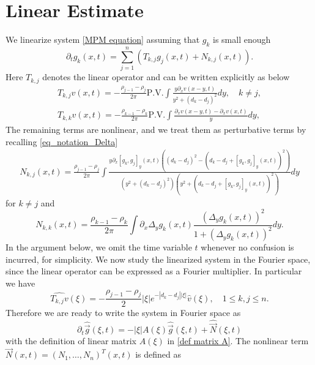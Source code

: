 \documentclass[11pt]{article}
\newcommand{\PV}{\mathrm{P.V.}}
\theoremstyle{definition}
\numberwithin{equation}{section}
\begin{document}
\section{Linear Estimate}\label{Sec Linear}
We linearize system \eqref{MPM equation} assuming that $g_k$ is small enough
\begin{equation}
   \partial_tg_k(x,t)=\sum_{j=1}^n\left(T_{k,j}g_j(x,t)+N_{k,j}(x,t)\right).
\end{equation}
Here $T_{k,j}$ denotes the linear operator and can be written explicitly as below
\begin{gather}\label{def linear operator}
    T_{k,j}v(x,t)=-\frac{\rho_{j-1}-\rho_j}{2\pi}\PV\int\frac{y\partial_xv(x-y,t)}{y^2+(d_k-d_j)^2}dy,\quad k\neq j,\\
    T_{k,k}v(x,t)=-\frac{\rho_{k-1}-\rho_k}{2\pi}\PV\int\frac{\partial_xv(x-y,t)-\partial_xv(x,t)}{y}dy,
\end{gather}
The remaining terms are nonlinear, and we treat them as perturbative terms by recalling \eqref{eq_notation_Delta}
\begin{gather}\label{def nonlinear k neq j}
    N_{k,j}(x,t)=\frac{\rho_{j-1}-\rho_j}{2\pi}\int\frac{y\partial_x[g_k,g_j]_y(x,t)\left((d_k-d_j)^2-(d_k-d_j+[g_k,g_j]_y(x,t))^2\right)}{(y^2+(d_k-d_j)^2)(y^2+(d_k-d_j+[g_k,g_j]_y(x,t))^2)}dy
\end{gather}
for $k\neq j$ and
\begin{equation}\label{def nonlinear kk}
    N_{k,k}(x,t)=\frac{\rho_{k-1}-\rho_k}{2\pi}\int\partial_x\Delta_yg_k(x,t)\frac{\left(\Delta_yg_k(x,t)\right)^2}{1+\left(\Delta_yg_k(x,t)\right)^2}dy.
\end{equation}
In the argument below, we omit the time variable $t$ whenever no confusion is incurred, for simplicity. We now study the linearized system in the Fourier space, since the linear operator can be expressed as a Fourier multiplier. In particular we have
\begin{equation}\label{fourier for linear}
    \widehat{T_{k,j}v}(\xi)=-\frac{\rho_{j-1}-\rho_j}{2}|\xi|e^{-|d_k-d_j||\xi|}\hat{v}(\xi),\quad 1\leq k,j\leq n.
\end{equation}
Therefore we are ready to write the system in Fourier space as
\begin{equation}\label{eq vector g}
    \partial_t\widehat{\vec{g}}(\xi,t)=-|\xi|A(\xi)\widehat{\vec{g}}(\xi,t)+\widehat{\vec{N}}(\xi,t)
\end{equation}
with the definition of linear matrix $A(\xi)$ in \eqref{def matrix A}. The nonlinear term $\vec{N}(x,t)=(N_1,\dots,N_n)^T(x,t)$ is defined as
\end{document}
